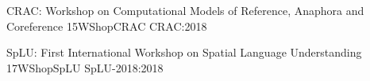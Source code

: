    \begin{wsschedule}
   {CRAC: Workshop on Computational Models of Reference, Anaphora and Coreference}
   {15}{WShopCRAC}
   {CRAC:2018}
   {\WShopLocCRAC}
   
 \end{wsschedule}

 \begin{wsschedule}
   {SpLU: First International Workshop on Spatial Language Understanding}
   {17}{WShopSpLU}
{SpLU-2018:2018}
   {\WShopLocSpLU}
   
 \end{wsschedule}



\clearpage{\thispagestyle{emptyheader}\cleardoublepage}
